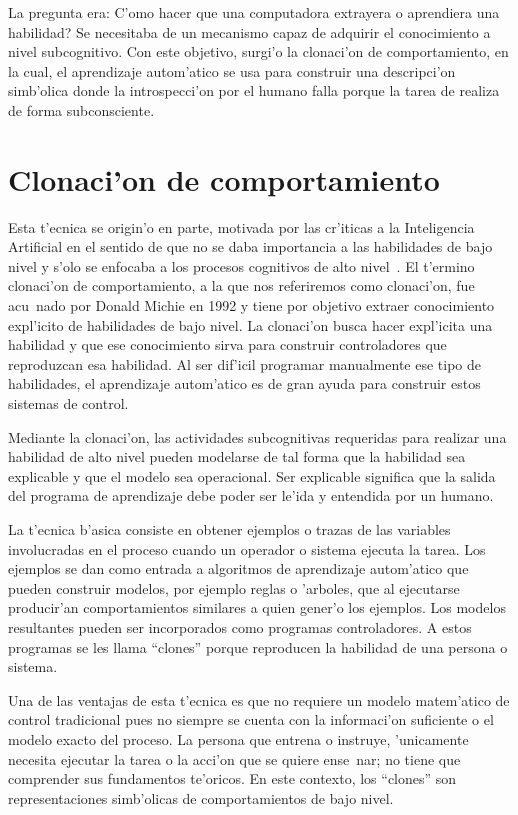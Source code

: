 \documentclass[11pt]{article}
\begin{document}
La pregunta era: \medskip \textquestiondown C'omo hacer que una computadora extrayera o aprendiera una habilidad? Se necesitaba de un mecanismo capaz de adquirir el conocimiento a nivel subcognitivo. Con este objetivo, surgi'o la clonaci'on de comportamiento, en la cual, el aprendizaje autom'atico se usa para construir una descripci'on simb'olica donde la introspecci'on por el humano falla porque la tarea de realiza de forma subconsciente. 

\section {Clonaci'on de comportamiento}

Esta t'ecnica se origin'o en parte, motivada por las cr'iticas a la Inteligencia Artificial en el sentido de que no se daba importancia a las habilidades de bajo nivel y s'olo se enfocaba a los procesos cognitivos de alto nivel~\cite{michiesammut:cloning}. El t'ermino \textsf{clonaci'on de comportamiento}, a la que nos referiremos como \textsf{clonaci'on}, fue acu~nado por Donald Michie en 1992 y tiene por objetivo extraer conocimiento expl'icito de habilidades de bajo nivel. La \textsf{clonaci'on} busca hacer expl'icita una habilidad y que ese conocimiento sirva para construir controladores que reproduzcan esa habilidad. Al ser dif'icil programar manualmente ese tipo de habilidades, el aprendizaje autom'atico es de gran ayuda para construir estos sistemas de control.

Mediante la clonaci'on, las actividades subcognitivas requeridas para realizar una habilidad de alto nivel pueden modelarse de tal forma que la habilidad sea explicable y que el modelo sea operacional. Ser explicable significa que la salida del programa de aprendizaje debe poder ser le'ida y entendida por un humano.

La t'ecnica b'asica consiste en obtener ejemplos o trazas de las variables involucradas en el proceso cuando un operador o sistema ejecuta la tarea. Los ejemplos se dan como entrada a algoritmos de aprendizaje autom'atico que pueden construir modelos, por ejemplo reglas o 'arboles, que al ejecutarse producir'an comportamientos similares a quien gener'o los ejemplos. Los modelos resultantes pueden ser incorporados como programas controladores. A estos programas se les llama ``clones'' porque reproducen la habilidad de una persona o sistema.

Una de las ventajas de esta t'ecnica es que no requiere un modelo matem'atico de control tradicional pues no siempre se cuenta con la informaci'on suficiente o el modelo exacto del proceso. La persona que entrena o instruye, 'unicamente necesita ejecutar la tarea o la acci'on que se quiere ense~nar; no tiene que comprender sus fundamentos te'oricos. En este contexto, los ``clones'' son representaciones simb'olicas de comportamientos de bajo nivel. 
\end{document}
